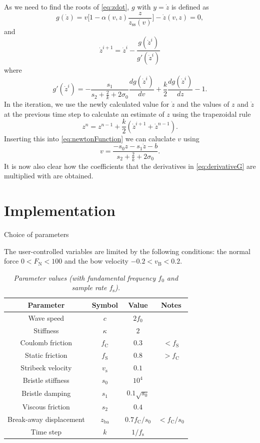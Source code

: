 \documentclass[twoside,a4paper]{article}
\begin{document}
As we need to find the roots of \eqref{eq:zdot}, $g$ with $y=\dot z$ is defined as
\begin{equation}
   g(\dot z) = v\bigg[1-\alpha(v, z)\frac{z}{z_\text{ss}(v)}\bigg] -  \dot z(v,z) = 0,
\end{equation}
and
\begin{equation}
    \dot z^{i+1} = \dot z^i - \frac{g(\dot z^i)}{g'(\dot z^i)}
\end{equation}
where
\begin{equation}\label{eq:derivativeG}
    g'(\dot z^i) = -\frac{s_1}{s_2+\frac{2}{k} + 2\sigma_0}\frac{dg(\dot z^i)}{dv} + \frac{k}{2}\frac{dg(\dot z^i)}{dz} - 1.
\end{equation}
In the iteration, we use the newly calculated value for $\dot z$ and the values of $z$ and $\dot z$ at the previous time step to calculate an estimate of $z$ using the trapezoidal rule
\begin{equation}
    z^n = z^{n-1} + \frac{k}{2}(\dot z^{i+1} + \dot z^{n-1}).
\end{equation}
Inserting this into \eqref{eq:newtonFunction} we can caluclate $v$ using
\begin{equation}
    v = \frac{-s_0z-s_1\dot z-b}{s_2 + \frac{2}{k} + 2\sigma_0}.
\end{equation}
It is now also clear how the coefficients that the derivatives in \eqref{eq:derivativeG} are multiplied with are obtained. 
\section{Implementation}\label{sec:implementation}
Choice of parameters


The user-controlled variables are limited by the following conditions: the normal force $0 < F_\text{N} < 100$ and the bow velocity $-0.2<v_\text{B} < 0.2$.
    
\begin{table}[ht]
  \caption{{\it Parameter values (with fundamental frequency $f_0$ and sample rate $f_\text{s}$).}}
	\centering
  \begin{tabular}{|c|c|c|c|}\hline
    Parameter & Symbol & Value & Notes\\ \hline
    Wave speed & $c$ & $2 f_0$ & \\
    Stiffness & $\kappa$ & $2$ & \\
    Coulomb friction & $f_\text{C}$ & $0.3$ & $<f_\text{S}$ \\
    Static friction & $f_\text{S}$ & $0.8$ & $>f_\text{C}$ \\
    Stribeck velocity & $v_\text{s}$ & $0.1$ & \\
    Bristle stiffness & $s_0$ & $10^4$ & \\
    Bristle damping & $s_1$ & $0.1\sqrt{s_0}$ & \\
    Viscous friction & $s_2$ & $0.4$ & \\
    Break-away displacement & $z_\text{ba}$ & $0.7 f_\text{C}/s_0$ & $<f_\text{C}/s_0$ \\
    Time step & $k$ & $1/f_\text{s}$ & \\\hline
 \end{tabular}
  \label{tab:example2}
\end{table}
\end{document}
